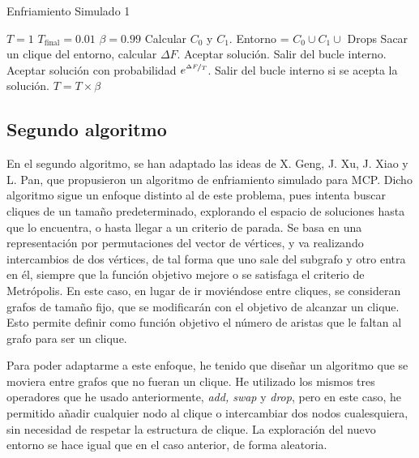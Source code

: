 \begin{algorithm}[H]
\caption{Enfriamiento Simulado 1}
  \begin{algorithmic}
    \State $T = 1$
    \State $T_{\text{final}} = 0.01$
    \State $\beta = 0.99$
    \State Calcular $C_0$ y $C_1$.
    \Repeat
      \State Entorno = $C_0 \cup C_1 \cup$ Drops
      \Repeat
        \State Sacar un clique del entorno, calcular $\Delta F$.
          \State Aceptar solución.
          \State Salir del bucle interno.
        \Else
          \State Aceptar solución con probabilidad $e^{\nicefrac{\Delta F}{T}}$.
          \State Salir del bucle interno si se acepta la solución.
        \EndIf
      \State $T = T \times \beta$
  \end{algorithmic}
\end{algorithm}

\subsection{Segundo algoritmo}

En el segundo algoritmo, se han adaptado las ideas de X. Geng, J. Xu, J. Xiao y L. Pan, que propusieron un
algoritmo de enfriamiento simulado para MCP. Dicho algoritmo sigue un enfoque distinto al de este problema,
pues intenta buscar cliques de un tamaño predeterminado, explorando el espacio de soluciones hasta
que lo encuentra, o hasta llegar a un criterio de parada. Se basa en una representación por permutaciones
del vector de vértices, y va realizando intercambios de dos vértices, de tal forma que uno sale del
subgrafo y otro entra en él, siempre que la función objetivo mejore o se satisfaga el criterio de Metrópolis.
En este caso, en lugar de ir moviéndose entre cliques, se consideran grafos de tamaño fijo, que se modificarán
con el objetivo de alcanzar un clique. Esto permite definir como función objetivo el número de aristas que le
faltan al grafo para ser un clique.

Para poder adaptarme a este enfoque, he tenido que diseñar un algoritmo que se moviera entre grafos que no
fueran un clique. He utilizado los mismos tres operadores que he usado anteriormente,
\textit{add, swap} y \textit{drop}, pero en este caso, he permitido añadir cualquier nodo al clique
o intercambiar dos nodos cualesquiera, sin necesidad de respetar la estructura de clique.
La exploración del nuevo entorno se hace igual que en el caso anterior, de forma aleatoria.

